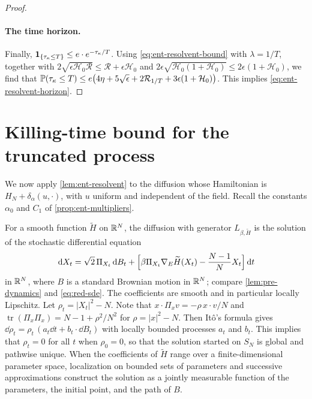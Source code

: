 \begin{proof}
\paragraph{The time horizon.}
Finally, $\mathbf 1_{\{\tau_\kappa\le T\}}\le e\cdot e^{-\tau_\kappa/T}$. Using
\eqref{eq:ent-resolvent-bound} with $\lambda=1/T$, together with
$2\sqrt{\epsilon\mathcal H_0\mathcal R}\le\mathcal R+\epsilon\mathcal H_0$ and
$2\epsilon\sqrt{\mathcal H_0(1+\mathcal H_0)}\le2\epsilon(1+\mathcal H_0)$, we
find that $\mathbb P(\tau_\kappa\le T)\le e\bigl(4\eta+5\sqrt\epsilon
+2\mathcal R_{1/T}+3\epsilon(1+\mathcal H_0)\bigr)$. This implies
\eqref{eq:ent-resolvent-horizon}.
\end{proof}

\section{Killing-time bound for the truncated process}\label{sec:ent-truncated}

We now apply \cref{lem:ent-resolvent} to the diffusion whose Hamiltonian is
$H_N+\delta_\alpha(u,\cdot)$, with $u$ uniform and independent of the field.
Recall the constants $\alpha_0$ and $C_1$ of \cref{prop:ent-multipliers}.

For a smooth function $\widetilde H$ on $\mathbb R^N$, the diffusion with generator
$L_{\beta,\widetilde H}$ is the solution of the stochastic differential
equation
\begin{equation}\label{eq:ent-sde}
 \,\mathrm d X_t=\sqrt2\,\Pi_{X_t}\,\mathrm d B_t
 +\Bigl[\beta \Pi_{X_t}\nabla_E\widetilde H(X_t)
 -\frac{N-1}{N}X_t\Bigr]\,\mathrm d t
\end{equation}
in $\mathbb R^N$, where $B$ is a standard Brownian motion in $\mathbb R^N$; compare
\cref{lem:pre-dynamics} and \eqref{eq:red-sde}. The coefficients are smooth and in particular
locally Lipschitz. Let $\rho_t=|X_t|^2-N$. Note that $x\cdot \Pi_xv=-\rho\,x\cdot v/N$
and $\operatorname{tr}(\Pi_x\Pi_x)=N-1+\rho^2/N^2$ for $\rho=|x|^2-N$.
Then It\^o's formula gives $\dd\rho_t=\rho_t\,(a_t\dd t+b_t\cdot\dd B_t)$
with locally bounded processes $a_t$ and $b_t$. This implies that $\rho_t=0$
for all $t$ when $\rho_0=0$, so that the solution started on $S_N$ is
global and pathwise unique. When the coefficients of
$\widetilde H$ range over a finite-dimensional parameter space, localization
on bounded sets of parameters and successive approximations construct the
solution as a jointly measurable function of the parameters, the initial
point, and the path of $B$.

